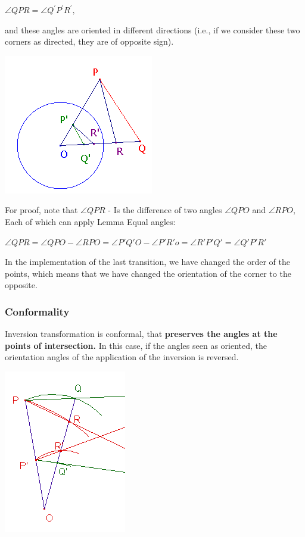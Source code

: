 $\angle QPR = \angle Q ^ \prime P ^ \prime R ^ \prime,$

and these angles are oriented in different directions (i.e., if we consider these two corners as directed, they are of opposite sign).

\includegraphics[scale=0.5]{11.png}

For proof, note that $\angle QPR$ - Is the difference of two angles $\angle QPO$ and $\angle RPO$, Each of which can apply Lemma Equal angles:

$\angle QPR=\angle QPO-\angle RPO=\angle P'Q'O-\angle P'R'o=\angle R'P'Q'=\angle Q'P'R'$

In the implementation of the last transition, we have changed the order of the points, which means that we have changed the orientation of the corner to the opposite.

\subsubsection{ Conformality }

Inversion transformation is conformal, that \textbf{preserves the angles at the points of intersection.} In this case, if the angles seen as oriented, the orientation angles of the application of the inversion is reversed.

\includegraphics[scale=0.5]{12.png}


